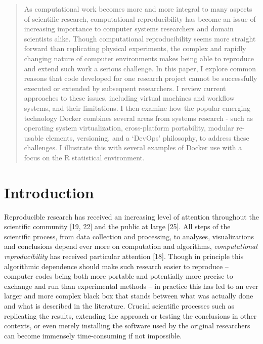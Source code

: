 \documentclass[9pt]{components/acm_proc_article-sp}
\begin{document}
\maketitle
\begin{abstract}
As computational work becomes more and more integral to many aspects of
scientific research, computational reproducibility has become an issue
of increasing importance to computer systems researchers and domain
scientists alike. Though computational reproducibility seems more
straight forward than replicating physical experiments, the complex and
rapidly changing nature of computer environments makes being able to
reproduce and extend such work a serious challenge. In this paper, I
explore common reasons that code developed for one research project
cannot be successfully executed or extended by subsequent researchers. I
review current approaches to these issues, including virtual machines
and workflow systems, and their limitations. I then examine how the
popular emerging technology Docker combines several areas from systems
research - such as operating system virtualization, cross-platform
portability, modular re-usable elements, versioning, and a `DevOps'
philosophy, to address these challenges. I illustrate this with several
examples of Docker use with a focus on the R statistical environment.
\end{abstract}


%

\section{Introduction}\label{introduction}

Reproducible research has received an increasing level of attention
throughout the scientific community {[}19, 22{]} and the public at large
{[}25{]}. All steps of the scientific process, from data collection and
processing, to analyses, visualizations and conclusions depend ever more
on computation and algorithms, \emph{computational reproducibility} has
received particular attention {[}18{]}. Though in principle this
algorithmic dependence should make such research easier to reproduce --
computer codes being both more portable and potentially more precise to
exchange and run than experimental methods -- in practice this has led
to an ever larger and more complex black box that stands between what
was actually done and what is described in the literature. Crucial
scientific processes such as replicating the results, extending the
approach or testing the conclusions in other contexts, or even merely
installing the software used by the original researchers can become
immensely time-consuming if not impossible.
\end{document}
